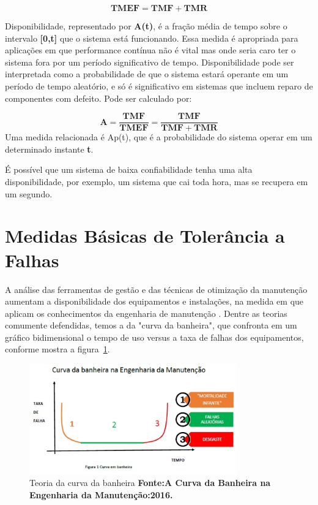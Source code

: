 \begin{equation}
\label{eqn01}
	\mathbf{TMEF} = \mathbf{TMF} + \mathbf{TMR} 
\end{equation}

Disponibilidade, representado por \textbf{A(t)}, é a fração média de tempo sobre o intervalo \textbf{[0,t]} que o sistema está funcionando. Essa medida é apropriada para aplicações em que performance contínua não é vital mas onde seria caro ter o sistema fora por um período significativo de tempo. 
Disponibilidade pode ser interpretada como a probabilidade de que o sistema estará operante em um período de tempo aleatório, e só é significativo em sistemas que incluem reparo de componentes com defeito. Pode ser calculado por:

\begin{equation}
\label{eqn02}
	\mathbf{A} = \mathbf{\frac{TMF}{TMEF}} = \mathbf{\frac{TMF}{TMF + TMR}}
\end{equation}
Uma medida relacionada é Ap(t), que é a probabilidade do sistema operar em um determinado instante \textbf{t}.

É possível que um sistema de baixa confiabilidade tenha uma alta disponibilidade, por exemplo, um sistema que cai toda hora, mas se recupera em um segundo.

\section{Medidas Básicas de Tolerância a Falhas}
\label{falhas}

A análise das ferramentas de gestão e das técnicas de otimização da manutenção aumentam a disponibilidade dos equipamentos e instalações, na medida em que aplicam os conhecimentos da engenharia de manutenção \cite{xenos1998gerenciando}. Dentre as teorias comumente defendidas, temos a da "curva da banheira", que confronta em um gráfico bidimensional o tempo de uso versus a taxa de falhas dos equipamentos, conforme mostra a figura~\ref{Curva da banheira}.

\graphicspath{{figuras/}}
\begin{figure}[h]
\centering
\includegraphics[width=0.8\textwidth]{curva_da_banheira.eps}
\caption{Teoria da curva da banheira \textbf{Fonte:A Curva da Banheira na Engenharia da Manutenção:2016.}}
\label{Curva da banheira}
\end{figure}

